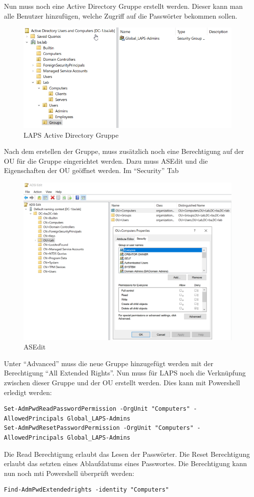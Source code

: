 Nun muss noch eine Active Directory Gruppe erstellt werden.
Dieser kann man alle Benutzer hinzufügen, welche Zugriff auf die Passwörter bekommen sollen.

\begin{figure}[H]
    \centering
    \includegraphics[width=0.7\linewidth]{../img/LAPS/Laps-Admins.png}
    \caption{LAPS Active Directory Gruppe}
\end{figure}

Nach dem erstellen der Gruppe, muss zusätzlich noch eine Berechtigung auf der OU für die Gruppe eingerichtet werden.
Dazu muss ASEdit und die Eigenschaften der OU geöffnet werden. Im ``Security'' Tab
\begin{figure}[H]
    \centering
    \includegraphics[width=0.7\linewidth]{../img/LAPS/ASEdit.png}
    \caption{ASEdit}
\end{figure}


Unter ``Advanced'' muss die neue Gruppe hinzugefügt werden mit der Berechtigung ``All Extended Rights''.
Nun muss für LAPS noch die Verknüpfung zwischen dieser Gruppe und der OU erstellt werden.
Dies kann mit Powershell erledigt werden:
\begin{lstlisting}
Set-AdmPwdReadPasswordPermission -OrgUnit "Computers" -AllowedPrincipals Global_LAPS-Admins
Set-AdmPwdResetPasswordPermission -OrgUnit "Computers" -AllowedPrincipals Global_LAPS-Admins
\end{lstlisting}
Die Read Berechtigung erlaubt das Lesen der Passwörter.
Die Reset Berechtigung erlaubt das setzten eines Ablaufdatums eines Passwortes.
Die Berechtigung kann nun noch mti Powershell überprüft werden:
\begin{lstlisting}
Find-AdmPwdExtendedrights -identity "Computers"
\end{lstlisting}


